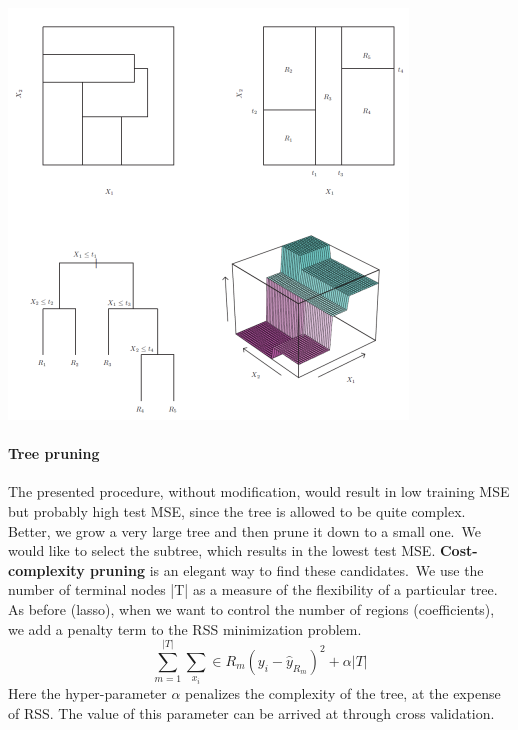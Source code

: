 \documentclass[../document.tex]{subfiles}
\begin{document}
	\begin{center}
		\includegraphics[width=.6\textwidth]{pictures/tree.png}
	\end{center}

	\paragraph{Tree pruning}
	The presented procedure, without modification, would result in low training MSE but probably high test MSE, since the tree is allowed to be quite complex. Better, we grow a very large tree and then prune it down to a small one.\
	We would like to select the subtree, which results in the lowest test MSE. \textbf{Cost-complexity pruning} is an elegant way to find these candidates.\
	We use the number of terminal nodes |T| as a measure of the flexibility of a particular tree. As before (lasso), when we want to control the number of regions (coefficients), we add a penalty term to the RSS minimization problem.
	\begin{equation}
		\sum_{m=1}^{|T|}\sum_{x_{i}} \in R_{m}(y_{i}-\hat{y}_{R_{m}})^2 + \alpha|T|
	\end{equation}
	Here the hyper-parameter \(\alpha\) penalizes the complexity of the tree, at the expense of RSS. The value of this parameter can be arrived at through cross validation.
\end{document}
